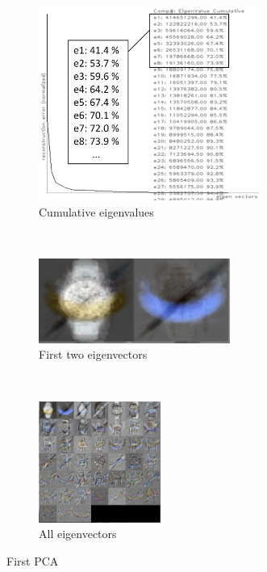 \documentclass[a4paper,10pt]{article}
\begin{document}
\begin{figure}[H]
\centering
     \begin{subfigure}[t]{0.3\textwidth}
      \centering
      \includegraphics[width=0.8\textwidth]{pictures/eigenvalue_dataset1}
      \caption{Cumulative eigenvalues}
      \label{fig:eigenvalue_dataset1}
    \end{subfigure}%
    ~
    \begin{subfigure}[t]{0.3\textwidth}
      \centering
      \includegraphics[width=\textwidth]{pictures/eigenvector_1}
      \caption{First two eigenvectors}
      \label{fig:eigenvector_1}
     \end{subfigure}
      ~
    \begin{subfigure}[t]{0.3\textwidth}
      \centering
      \includegraphics[width=4cm]{pictures/eigenvectors}
      \caption{All eigenvectors}
      \label{fig:eigenvectors}
     \end{subfigure}
     \caption{First PCA}
     \label{fig:PCA}
\end{figure}
\end{document}
